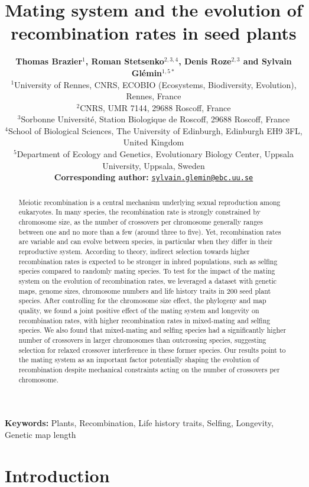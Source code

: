 \documentclass{article}
\title{Mating system and the evolution of recombination rates in seed plants}
\author{
    \large
    \textbf{Thomas {Brazier}$^{1}$\orcidlink{0000-0001-5990-7545}, Roman {Stetsenko}$^{2,3,4}$\orcidlink{0000-0001-9196-9615}, Denis {Roze}$^{2,3}$ and Sylvain {Glémin}$^{1,5*}$\orcidlink{0000-0001-7260-4573}}\\
    \normalsize
    $^{1}$University of Rennes, CNRS, ECOBIO (Ecosystems, Biodiversity, Evolution), Rennes, France\\
    $^{2}$CNRS, UMR 7144, 29688 Roscoff, France\\
    $^{3}$Sorbonne Université, Station Biologique de Roscoff, 29688 Roscoff, France\\
    $^{4}$School of Biological Sciences, The University of Edinburgh, Edinburgh EH9 3FL, United Kingdom\\
    $^{5}$Department of Ecology and Genetics, Evolutionary Biology Center, Uppsala University, Uppsala, Sweden \\
    \textbf{Corresponding author:} \texttt{\href{sylvain.glemin@ebc.uu.se}{sylvain.glemin@ebc.uu.se}} \\
}
\begin{document}
\maketitle



\begin{abstract}
Meiotic recombination is a central mechanism underlying sexual reproduction among eukaryotes. In many species, the recombination rate is strongly constrained by chromosome size, as the number of crossovers per chromosome generally ranges between one and no more than a few (around three to five). Yet, recombination rates are variable and can evolve between species, in particular when they differ in their reproductive system. According to theory, indirect selection towards higher recombination rates is expected to be stronger in inbred populations, such as selfing species compared to randomly mating species. To test for the impact of the mating system on the evolution of recombination rates, we leveraged a dataset with genetic maps, genome sizes, chromosome numbers and life history traits in 200 seed plant species. After controlling for the chromosome size effect, the phylogeny and map quality, we found a joint positive effect of the mating system and longevity on recombination rates, with higher recombination rates in mixed-mating and selfing species. We also found that mixed-mating and selfing species had a significantly higher number of crossovers in larger chromosomes than outcrossing species, suggesting selection for relaxed crossover interference in these former species. Our results point to the mating system as an important factor potentially shaping the evolution of recombination despite mechanical constraints acting on the number of crossovers per chromosome.
\end{abstract}




\textbf{Keywords:} Plants, Recombination, Life history traits, Selfing, Longevity, Genetic map length\\





\newpage



\section*{Introduction}
\end{document}
